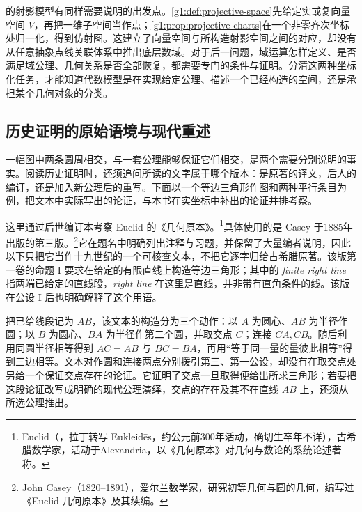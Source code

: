 的射影模型有同样需要说明的出发点。\cref{g1:def:projective-space}先给定实或复向量空间 \(V\)，再把一维子空间当作点；\cref{g1:prop:projective-charts}在一个非零齐次坐标处归一化，得到仿射图。这建立了向量空间与所构造射影空间之间的对应，却没有从任意抽象点线关联体系中推出底层数域。对于后一问题，域运算怎样定义、是否满足域公理、几何关系是否全部恢复，都需要专门的条件与证明。分清这两种坐标化任务，才能知道代数模型是在实现给定公理、描述一个已经构造的空间，还是承担某个几何对象的分类。

\subsection{历史证明的原始语境与现代重述}
\label{g1:subsec:A02:02}

一幅图中两条圆周相交，与一套公理能够保证它们相交，是两个需要分别说明的事实。阅读历史证明时，还须追问所读的文字属于哪个版本：是原著的译文，后人的编订，还是加入新公理后的重写。下面以一个等边三角形作图和两种平行条目为例，把文本中实际写出的论证，与本书在实坐标中补出的论证并排考察。

\ProseParagraphBreak

这里通过后世编订本考察 Euclid 的《几何原本》。\footnote{Euclid（，拉丁转写 Eukleidēs，约公元前300年活动，确切生卒年不详），古希腊数学家，活动于Alexandria，以《几何原本》对几何与数论的系统论述著称。}具体使用的是 Casey 于1885年出版的第三版。\footnote{John Casey（1820--1891），爱尔兰数学家，研究初等几何与圆的几何，编写过《Euclid 几何原本》及其续编。}它在题名中明确列出注释与习题，并保留了大量编者说明，因此以下只把它当作十九世纪的一个可核查文本，不把它逐字归给古希腊原著。该版第一卷的命题 I 要求在给定的有限直线上构造等边三角形；其中的 \emph{finite right line} 指两端已给定的直线段，\emph{right line} 在这里是直线，并非带有直角条件的线。该版在公设 I 后也明确解释了这个用语。\cite[第一卷，公设 I；命题 I]{Casey1885Euclid}

\ProseParagraphBreak

把已给线段记为 \(AB\)，该文本的构造分为三个动作：以 \(A\) 为圆心、\(AB\) 为半径作圆；以 \(B\) 为圆心、\(BA\) 为半径作第二个圆，并取交点 \(C\)；连接 \(CA,CB\)。随后利用同圆半径相等得到 \(AC=AB\) 与 \(BC=BA\)，再用“等于同一量的量彼此相等”得到三边相等。文本对作圆和连接两点分别援引第三、第一公设，却没有在取交点处另给一个保证交点存在的论证。它证明了交点一旦取得便给出所求三角形；若要把这段论证改写成明确的现代公理演绎，交点的存在及其不在直线 \(AB\) 上，还须从所选公理推出。

\ProseParagraphBreak

